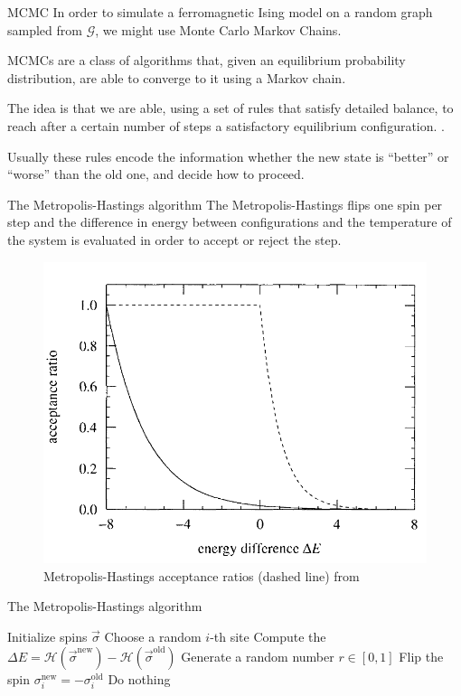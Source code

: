 \documentclass[handout]{beamer}
\begin{document}
\begin{frame}{MCMC}
    In order to simulate a ferromagnetic Ising model on a random graph sampled
    from $\mathcal{G}$, we might use \alert{Monte Carlo Markov Chains}.

    MCMCs are a class of algorithms that, given an equilibrium probability
    distribution, are able to converge to it using a Markov chain.

    The idea is that we are able, using a set of rules that satisfy detailed
    balance, to reach after a certain number of steps a satisfactory
    equilibrium configuration. \cite[31-42]{newman_barkema}.

    Usually these rules encode the information whether the new state is
    ``better'' or ``worse'' than the old one, and decide how to proceed.
\end{frame}

\begin{frame}{The Metropolis-Hastings algorithm}
    The \alert{Metropolis-Hastings} flips one spin per step and the difference
    in energy between configurations and the temperature of the system is
    evaluated in order to accept or reject the step. \cite[46]{newman_barkema}

    \begin{figure}
        \centering
        \includegraphics[width=.4\textwidth]{metropolis_acceptance.png}
        \caption{Metropolis-Hastings acceptance ratios (dashed line) from
        \cite[48]{newman_barkema}}
    \end{figure}
\end{frame}

\begin{frame}{The Metropolis-Hastings algorithm}
    \begin{algorithm}[H]
        \begin{algorithmic}[1]
            \STATE Initialize spins $\vec \sigma$
                \STATE Choose a random $i$-th site
                \STATE Compute the $\Delta E =
                    \mathcal{H}(\vec\sigma^{\text{new}}) -
                    \mathcal{H}(\vec\sigma^{\text{old}})$
                \STATE Generate a random number $r\in [0,1]$
                \STATE Flip the spin $\sigma_i^{\text{new}} =
                -\sigma_i^{\text{old}}$
                \ELSE
                    \STATE Do nothing
                \ENDIF
            \ENDWHILE
        \end{algorithmic}
        \caption{Metropolis-Hastings algorithm}
        \label{algo:metropolis}
    \end{algorithm}
\end{frame}
\end{document}
